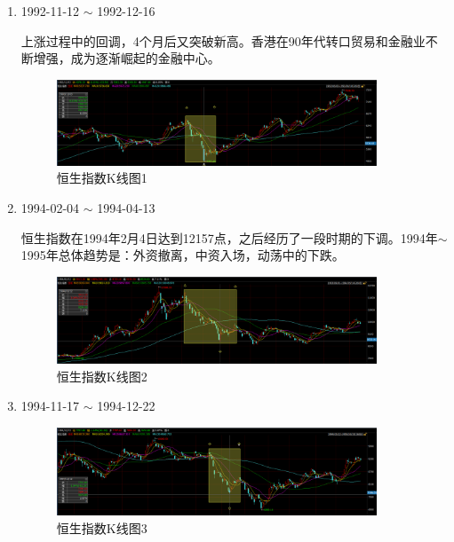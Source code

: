 \documentclass[12pt,a4paper]{article}
\begin{document}
\begin{enumerate}
	\item 1992-11-12 $\sim$ 1992-12-16
	
	上涨过程中的回调，4个月后又突破新高。香港在90年代转口贸易和金融业不断增强，成为逐渐崛起的金融中心。
	
	\begin{figure}[H]
		\centering
		\includegraphics[width=0.9\textwidth]{img/31.png}%
		\caption{恒生指数K线图1}
	\end{figure}	
	
	\item 1994-02-04 $\sim$ 1994-04-13
	
	恒生指数在1994年2月4日达到12157点，之后经历了一段时期的下调。1994年$\sim$1995年总体趋势是：外资撤离，中资入场，动荡中的下跌。
	
	\begin{figure}[H]
		\centering
		\includegraphics[width=0.9\textwidth]{img/32.png}%
		\caption{恒生指数K线图2}
	\end{figure}	
	
	\item 1994-11-17 $\sim$ 1994-12-22
	
	\begin{figure}[H]
		\centering
		\includegraphics[width=0.9\textwidth]{img/33.png}%
		\caption{恒生指数K线图3}
	\end{figure}	
		

\end{enumerate}
\end{document}
